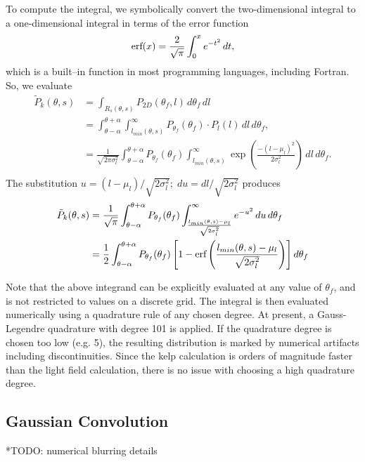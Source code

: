To compute the integral, we symbolically convert the two-dimensional integral to a one-dimensional integral in terms of the error function
\begin{equation}
  \mbox{erf}(x) = \frac{2}{\sqrt{\pi}} \int_0^x e^{-t^2}\, dt,
\end{equation}
which is a built--in function in most programming languages, including Fortran.
So, we evaluate
\begin{align*}
	\tilde{P}_k(\theta, s) &= \int_{R_s(\theta,s)}P_{2D}(\theta_f,l)\, d\theta_f\, dl \\
  &= \int_{\theta-\alpha}^{\theta+\alpha}
  \int_{l_{min}(\theta,s)}^{\infty}
  P_{\theta_f}(\theta_f) \cdot P_l(l)
  \, dl\, d\theta_f, \\
  &= \frac{1}{\sqrt{2\pi\sigma_l^2}}
  \int_{\theta-\alpha}^{\theta+\alpha}
  P_{\theta_f}(\theta_f)
  \int_{l_{min}(\theta,s)}^{\infty}
  \exp\left(\frac{-(l-\mu_l)^2}{2\sigma_l^2}\right)
  \, dl\, d\theta_f. \\
\end{align*}
The substitution $u=(l-\mu_l)/\sqrt{2\sigma_l^2};\; du=dl/\sqrt{2\sigma_l^2}$ produces
\begin{align*}
  \tilde{P}_k(\theta, s)
  &= \frac{1}{\sqrt{\pi}}
  \int_{\theta-\alpha}^{\theta+\alpha}
  P_{\theta_f}(\theta_f)
  \int_{\frac{l_{min}(\theta,s)-\mu_l}{\sqrt{2\sigma_l^2}}}^{\infty}
  e^{-u^{2}}\, du
  \, d\theta_f \\
  &= \frac{1}{2}
  \int_{\theta-\alpha}^{\theta+\alpha}
  P_{\theta_f}(\theta_f)
  \left[1 - \mbox{erf}\left(\frac{l_{min}(\theta,s)-\mu_l}{\sqrt{2\sigma_l^2}}\right)\right]
  d\theta_f
\end{align*}

Note that the above integrand can be explicitly evaluated at any value of $\theta_f$, and is not restricted to values on a discrete grid.
The integral is then evaluated numerically using a quadrature rule of any chosen degree.
At present, a Gauss-Legendre quadrature with degree 101 is applied.
If the quadrature degree is chosen too low (e.g. 5), the resulting distribution is marked by numerical artifacts including discontinuities.
Since the kelp calculation is orders of magnitude faster than the light field calculation, there is no issue with choosing a high quadrature degree.

\subsection{Gaussian Convolution}
*TODO: numerical blurring details

